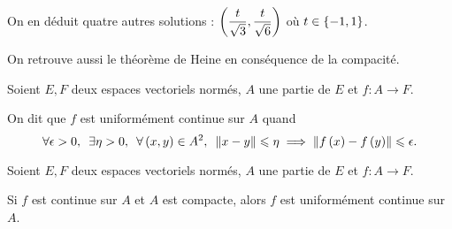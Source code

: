 \begin{corr}
On en déduit quatre autres solutions : \(\left(\dfrac{t}{\sqrt{3}},\dfrac{t}{\sqrt{6}}\right)\) où \(t\in\left\lbrace-1,1\right\rbrace\).

\end{corr}

On retrouve aussi le théorème de Heine en conséquence de la compacité.

\begin{defi}
Soient \(E,F\) deux espaces vectoriels normés, \(A\) une partie de \(E\) et \(f:A\to F\).

On dit que \(f\) est uniformément continue sur \(A\) quand \[\quantifs{\forall\epsilon>0;\exists\eta>0;\forall\paren{x,y}\in A^2}\norme{x-y}\leq\eta\imp\norme{f\paren{x}-f\paren{y}}\leq\epsilon.\]
\end{defi}

\begin{theo}
Soient \(E,F\) deux espaces vectoriels normés, \(A\) une partie de \(E\) et \(f:A\to F\).

Si \(f\) est continue sur \(A\) et \(A\) est compacte, alors \(f\) est uniformément continue sur \(A\).
\end{theo}

